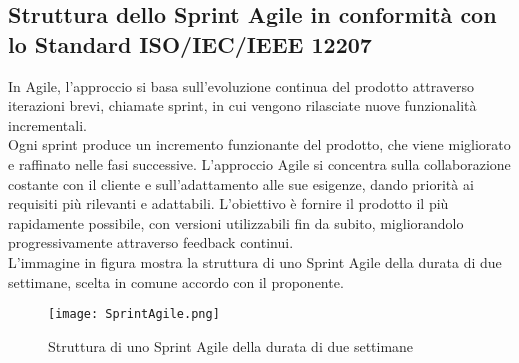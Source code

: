 \newpage

\subsection{Struttura dello Sprint Agile in conformità con lo Standard ISO/IEC/IEEE 12207}
In Agile, l'approccio si basa sull'evoluzione continua del prodotto attraverso iterazioni brevi, chiamate sprint, in cui vengono rilasciate nuove funzionalità incrementali.\\
Ogni sprint produce un incremento funzionante del prodotto, che viene migliorato e raffinato nelle fasi successive. L'approccio Agile si concentra sulla collaborazione costante con il cliente e sull'adattamento alle sue esigenze, dando priorità ai requisiti più rilevanti e adattabili. L'obiettivo è fornire il prodotto il più rapidamente possibile, con versioni utilizzabili fin da subito, migliorandolo progressivamente attraverso feedback continui.\\
L'immagine in figura  mostra la struttura di uno Sprint Agile della durata di due settimane, scelta in comune accordo con il proponente.\\
\begin{figure}[h] 
    \centering
    \texttt{[image: SprintAgile.png]}
    \caption{Struttura di uno Sprint Agile della durata di due settimane} 
    \label{fig:Struttura di uno Sprint Agile della durata di due settimane}
\end{figure}

